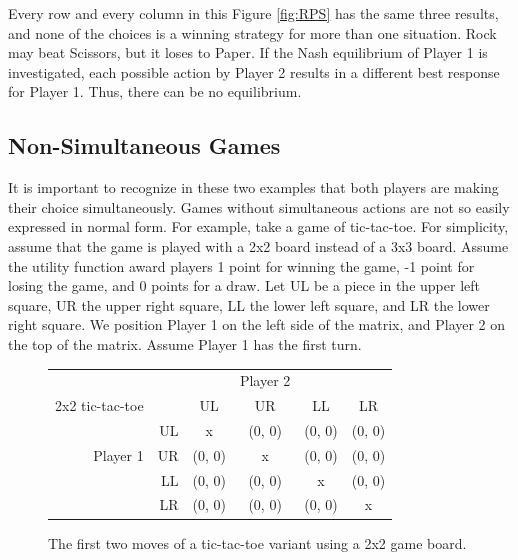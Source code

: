 Every row and every column in this Figure \ref{fig:RPS} has the same three results, and none of the choices is a winning strategy for more than one situation. Rock may beat Scissors, but it loses to Paper. If the Nash equilibrium of Player 1 is investigated, each possible action by Player 2 results in a different best response for Player 1. Thus, there can be no equilibrium.

\subsection{Non-Simultaneous Games}
It is important to recognize in these two examples that both players are making their choice simultaneously. Games without simultaneous actions are not so easily expressed in normal form. For example, take a game of tic-tac-toe. For simplicity, assume that the game is played with a 2x2 board instead of a 3x3 board. Assume the utility function award players 1 point for winning the game, -1 point for losing the game, and 0 points for a draw. Let UL be a piece in the upper left square, UR the upper right square, LL the lower left square, and LR the lower right square. We position Player 1 on the left side of the matrix, and Player 2 on the top of the matrix. Assume Player 1 has the first turn.\\
\begin{figure}[H]
  \centering
  \begin{tabular}{r r | c | c | c | c |}
    &\multicolumn{1}{c}{}&\multicolumn{1}{c}{}&\multicolumn{1}{c}{Player 2}&\multicolumn{1}{c}{}\\
    \multicolumn{1}{c}{2x2 tic-tac-toe}&\multicolumn{1}{c}{}&\multicolumn{1}{c}{UL}&
    \multicolumn{1}{c}{UR}&\multicolumn{1}{c}{LL}&\multicolumn{1}{c}{LR}\\ \cline{3-6}
    & UL & x & (0, 0) & (0, 0) & (0, 0) \\ \cline{3-6}
    Player 1 & UR & (0, 0) & x & (0, 0) & (0, 0) \\ \cline{3-6}
    & LL & (0, 0) & (0, 0) & x & (0, 0) \\ \cline{3-6}
    & LR & (0, 0) & (0, 0) & (0, 0) & x \\ \cline{3-6}
  \end{tabular}
  \caption{The first two moves of a tic-tac-toe variant using a 2x2 game board.}
  \label{fig:2x2TTT}
\end{figure}

